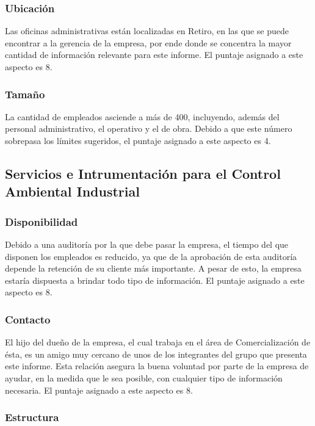 \documentclass[12pt,a4paper,spanish]{article}
\begin{document}
\subsubsection{Ubicaci\'{o}n}

Las oficinas administrativas est\'{a}n localizadas en Retiro, en las que se puede encontrar a la gerencia de la empresa, por ende donde se concentra la mayor cantidad de informaci\'{o}n relevante para este informe. El puntaje asignado a este aspecto es 8. 

\subsubsection{Tama\~{n}o}

La cantidad de empleados asciende a m\'{a}s de 400, incluyendo, adem\'{a}s del personal administrativo, el operativo y el de obra. Debido a que este n\'{u}mero sobrepasa los l\'{i}mites sugeridos, el puntaje asignado a este aspecto es 4.

\subsection{Servicios e Intrumentaci\'{o}n para el Control Ambiental Industrial}
\subsubsection{Disponibilidad}

Debido a una auditor\'{i}a por la que debe pasar la empresa, el tiempo del que disponen los empleados es reducido, ya que de la aprobaci\'{o}n de esta auditor\'{i}a depende la retenci\'{o}n de su cliente m\'{a}s importante. A pesar de esto, la empresa estar\'{i}a dispuesta a brindar todo tipo de informaci\'{o}n. El puntaje asignado a este aspecto es 8.

\subsubsection{Contacto}

El hijo del due\~{n}o de la empresa, el cual trabaja en el \'{a}rea de Comercializaci\'{o}n de \'{e}sta, es un amigo muy cercano de unos de los integrantes del grupo que presenta este informe. Esta relaci\'{o}n asegura la buena voluntad por parte de la empresa de ayudar, en la medida que le sea posible, con cualquier tipo de informaci\'{o}n necesaria. El puntaje asignado a este aspecto es 8.

\subsubsection{Estructura}
\end{document}
